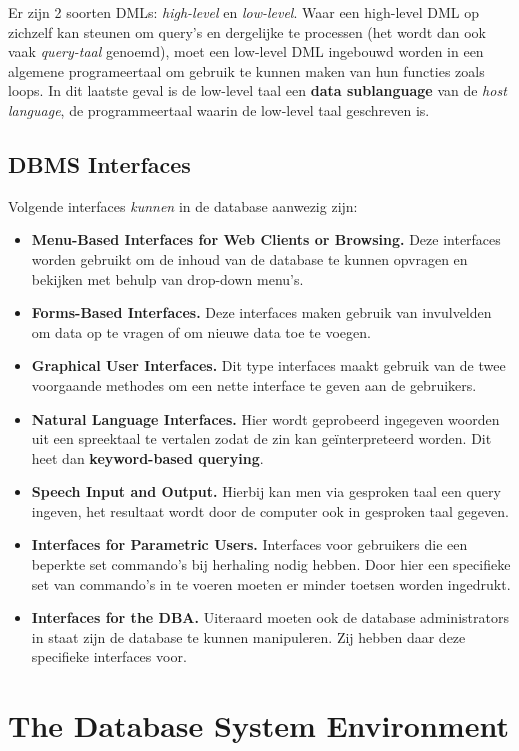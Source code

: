 Er zijn 2 soorten DMLs: \textit{high-level} en \textit{low-level}. Waar een high-level DML op zichzelf kan steunen om query's en dergelijke te processen (het wordt dan ook vaak \textit{query-taal} genoemd), moet een low-level DML ingebouwd worden in een algemene programeertaal om gebruik te kunnen maken van hun functies zoals loops. In dit laatste geval is de low-level taal een \textbf{data sublanguage} van de \textit{host language}, de programmeertaal waarin de low-level taal geschreven is.

\subsection{DBMS Interfaces}
Volgende interfaces \textit{kunnen} in de database aanwezig zijn:
\begin{itemize}
\item \textbf{Menu-Based Interfaces for Web Clients or Browsing.} Deze interfaces worden gebruikt om de inhoud van de database te kunnen opvragen en bekijken met behulp van drop-down menu's.
\item \textbf{Forms-Based Interfaces.} Deze interfaces maken gebruik van invulvelden om data op te vragen of om nieuwe data toe te voegen. 
\item \textbf{Graphical User Interfaces.} Dit type interfaces maakt gebruik van de twee voorgaande methodes om een nette interface te geven aan de gebruikers.
\item \textbf{Natural Language Interfaces.} Hier wordt geprobeerd ingegeven woorden uit een spreektaal te vertalen zodat de zin kan ge\"interpreteerd worden. Dit heet dan \textbf{keyword-based querying}.
\item \textbf{Speech Input and Output.} Hierbij kan men via gesproken taal een query ingeven, het resultaat wordt door de computer ook in gesproken taal gegeven.
\item \textbf{Interfaces for Parametric Users.} Interfaces voor gebruikers die een beperkte set commando's bij herhaling nodig hebben. Door hier een specifieke set van commando's in te voeren moeten er minder toetsen worden ingedrukt.
\item \textbf{Interfaces for the DBA.} Uiteraard moeten ook de database administrators in staat zijn de database te kunnen manipuleren. Zij hebben daar deze specifieke interfaces voor.
\end{itemize}


\section{The Database System Environment}
